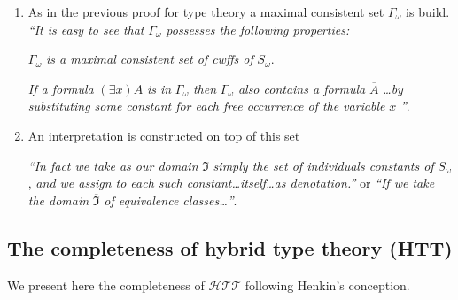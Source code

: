 \begin{enumerate}
\item As in the previous proof for type theory a maximal consistent set
$\Gamma_{\omega}$ is build. \emph{``It is easy to see that} 
$\Gamma_{\omega}$ \emph{possesses the following properties:}

$\Gamma_{\omega}$ \emph{is a maximal consistent set of cwffs of}
$S_{\omega}$.

\emph{If a formula} $(\exists x)A$ \emph{is in} $\Gamma_{\omega}$
\emph{then} $\Gamma_{\omega}$ \emph{also contains a formula}
$\overline{A}$ \emph{\ldots by substituting some constant for each free
occurrence of the variable} $x$ \emph{''}.

\item An interpretation is constructed on top of this set

\emph{``In fact we take as our domain} $\Im$ \emph{simply the set of
individuals constants of} $S_{\omega}$, \emph{and we assign to each such
constant\ldots itself\ldots as denotation.''} or \emph{``If we take the
domain} $\overline{\Im }$ \emph{of equivalence classes\ldots ''}.
\end{enumerate}

\subsection{The completeness of hybrid type theory (HTT)}

We present here the completeness of $\mathcal{HTT}$ following Henkin's
conception.

